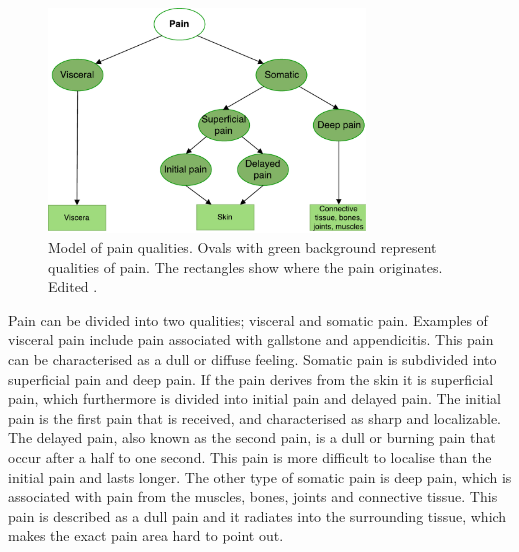 \begin{figure} [H]
\centering
\includegraphics[width=0.75\textwidth]{figures/painpic}
\caption{Model of pain qualities. Ovals with green background  represent qualities of pain. The rectangles show where the pain originates. Edited \citep{Schmidt2013}.}
\label{fig:qualities}
\end{figure}

\noindent
Pain can be divided into two qualities; visceral and somatic pain. Examples of visceral pain include pain associated with gallstone and appendicitis. This pain can be characterised as a dull or diffuse feeling. Somatic pain is subdivided into superficial pain and deep pain. If the pain derives from the skin it is superficial pain, which furthermore is divided into initial pain and delayed pain. The initial pain is the first pain that is received, and characterised as sharp and localizable. The delayed pain, also known as the second pain, is a dull or burning pain that occur after a half to one second. This pain is more difficult to localise than the initial pain and lasts longer.\citep{Schmidt1989, Schmidt2013}
The other type of somatic pain is deep pain, which is associated with pain from the muscles, bones, joints and connective tissue. This pain is described as a dull pain and it radiates into the surrounding tissue, which makes the exact pain area hard to point out.\citep{Schmidt1989, Schmidt2013}

